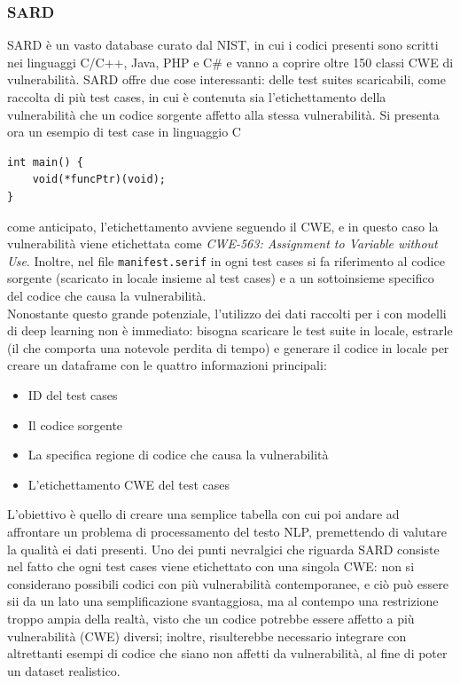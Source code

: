 \documentclass[conference]{IEEEtran}
\begin{document}
\subsubsection{SARD}
SARD è un vasto database curato dal NIST, in cui i codici presenti sono scritti nei linguaggi C/C++, Java, PHP e C\# e vanno a coprire oltre 150 classi CWE di vulnerabilità. SARD offre due cose interessanti: delle test suites scaricabili, come raccolta di più test cases, in cui è contenuta sia l'etichettamento della vulnerabilità che un codice sorgente affetto alla stessa vulnerabilità. Si presenta ora un esempio di test case in linguaggio C
\begin{verbatim}
int main() {
    void(*funcPtr)(void);
}
\end{verbatim}
come anticipato, l'etichettamento avviene seguendo il CWE, e in questo caso la vulnerabilità viene etichettata come \textit{CWE-563: Assignment to Variable without Use}. Inoltre, nel file \texttt{manifest.serif} in ogni test cases si fa riferimento al codice sorgente (scaricato in locale insieme al test cases) e a un sottoinsieme specifico del codice che causa la vulnerabilità. \\
Nonostante questo grande potenziale, l'utilizzo dei dati raccolti per i con modelli di deep learning non è immediato: bisogna scaricare le test suite in locale, estrarle (il che comporta una notevole perdita di tempo) e generare il codice in locale per creare un dataframe con le quattro informazioni principali:
\begin{itemize}
    \item ID del test cases
    \item Il codice sorgente
    \item La specifica regione di codice che causa la vulnerabilità
    \item L'etichettamento CWE del test cases
\end{itemize}
L'obiettivo è quello di creare una semplice tabella con cui poi andare ad affrontare un problema di processamento del testo NLP, premettendo di valutare la qualità ei dati presenti. Uno dei punti nevralgici che riguarda SARD consiste nel fatto che ogni test cases viene etichettato con una singola CWE: non si considerano possibili codici con più vulnerabilità contemporanee, e ciò può essere sii da un lato una semplificazione svantaggiosa, ma al contempo una restrizione troppo ampia della realtà, visto che un codice potrebbe essere affetto a più vulnerabilità (CWE) diversi; inoltre, risulterebbe necessario integrare con altrettanti esempi di codice che siano non affetti da vulnerabilità, al fine di poter un dataset realistico.
\end{document}
